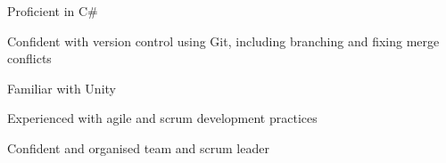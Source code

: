 


\begin{cvparagraph}
    
    \begin{cvitems}
        \text{}
        \item
        \item Proficient in C\# 
        \item Confident with version control using Git, including branching and fixing merge conflicts
        \item Familiar with Unity
        \item Experienced with agile and scrum development practices
        \item Confident and organised team and scrum leader
    \end{cvitems}

\end{cvparagraph}